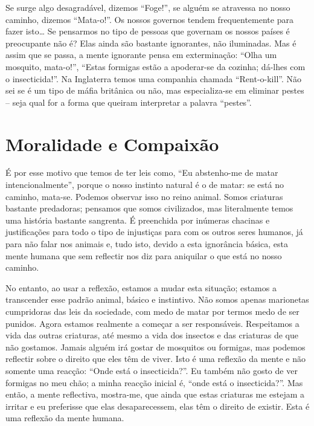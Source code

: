 Se surge algo desagradável, dizemos “Foge!”, se alguém se atravessa no nosso
caminho, dizemos “Mata-o!”. Os nossos governos tendem frequentemente para fazer
isto\ldots{} Se pensarmos no tipo de pessoas que governam os nossos países é
preocupante não é? Elas ainda são bastante ignorantes, não iluminadas. Mas é
assim que se passa, a mente ignorante pensa em exterminação: “Olha um mosquito,
mata-o!”, “Estas formigas estão a apoderar-se da cozinha; dá-lhes com o
insecticida!”. Na Inglaterra temos uma companhia chamada “Rent-o-kill”. Não sei
se é um tipo de máfia britânica ou não, mas especializa-se em eliminar pestes –
seja qual for a forma que queiram interpretar a palavra “pestes”.

\section{Moralidade e Compaixão}

É por esse motivo que temos de ter leis como, “Eu abstenho-me de matar
intencionalmente”, porque o nosso instinto natural é o de matar: se está no
caminho, mata-se. Podemos observar isso no reino animal. Somos criaturas
bastante predadoras; pensamos que somos civilizados, mas literalmente temos uma
história bastante sangrenta. É preenchida por inúmeras chacinas e justificações
para todo o tipo de injustiças para com os outros seres humanos, já para não
falar nos animais e, tudo isto, devido a esta ignorância básica, esta mente
humana que sem reflectir nos diz para aniquilar o que está no nosso caminho.

No entanto, ao usar a reflexão, estamos a mudar esta situação; estamos a
transcender esse padrão animal, básico e instintivo. Não somos apenas marionetas
cumpridoras das leis da sociedade, com medo de matar por termos medo de ser
punidos. Agora estamos realmente a começar a ser responsáveis. Respeitamos a
vida das outras criaturas, até mesmo a vida dos insectos e das criaturas de que
não gostamos. Jamais alguém irá gostar de mosquitos ou formigas, mas podemos
reflectir sobre o direito que eles têm de viver. Isto é uma reflexão da mente e
não somente uma reacção: “Onde está o insecticida?”. Eu também não gosto de ver
formigas no meu chão; a minha reacção inicial é, “onde está o insecticida?”. Mas
então, a mente reflectiva, mostra-me, que ainda que estas criaturas me estejam a
irritar e eu preferisse que elas desaparecessem, elas têm o direito de existir.
Esta é uma reflexão da mente humana.

